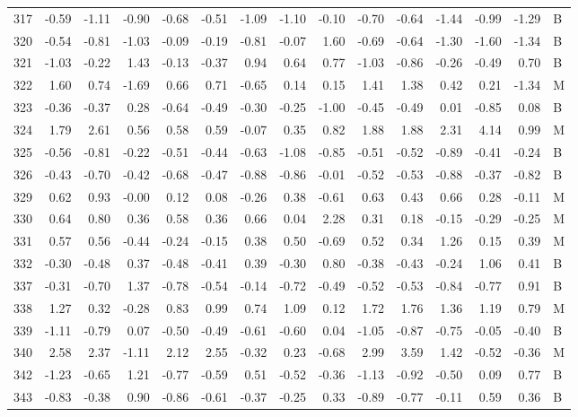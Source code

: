 \begin{table}[ht]
\begin{tabular}{rrrrrrrrrrrrrrl}
  317 & -0.59 & -1.11 & -0.90 & -0.68 & -0.51 & -1.09 & -1.10 & -0.10 & -0.70 & -0.64 & -1.44 & -0.99 & -1.29 & B \\ 
  320 & -0.54 & -0.81 & -1.03 & -0.09 & -0.19 & -0.81 & -0.07 & 1.60 & -0.69 & -0.64 & -1.30 & -1.60 & -1.34 & B \\ 
  321 & -1.03 & -0.22 & 1.43 & -0.13 & -0.37 & 0.94 & 0.64 & 0.77 & -1.03 & -0.86 & -0.26 & -0.49 & 0.70 & B \\ 
  322 & 1.60 & 0.74 & -1.69 & 0.66 & 0.71 & -0.65 & 0.14 & 0.15 & 1.41 & 1.38 & 0.42 & 0.21 & -1.34 & M \\ 
  323 & -0.36 & -0.37 & 0.28 & -0.64 & -0.49 & -0.30 & -0.25 & -1.00 & -0.45 & -0.49 & 0.01 & -0.85 & 0.08 & B \\ 
  324 & 1.79 & 2.61 & 0.56 & 0.58 & 0.59 & -0.07 & 0.35 & 0.82 & 1.88 & 1.88 & 2.31 & 4.14 & 0.99 & M \\ 
  325 & -0.56 & -0.81 & -0.22 & -0.51 & -0.44 & -0.63 & -1.08 & -0.85 & -0.51 & -0.52 & -0.89 & -0.41 & -0.24 & B \\ 
  326 & -0.43 & -0.70 & -0.42 & -0.68 & -0.47 & -0.88 & -0.86 & -0.01 & -0.52 & -0.53 & -0.88 & -0.37 & -0.82 & B \\ 
  329 & 0.62 & 0.93 & -0.00 & 0.12 & 0.08 & -0.26 & 0.38 & -0.61 & 0.63 & 0.43 & 0.66 & 0.28 & -0.11 & M \\ 
  330 & 0.64 & 0.80 & 0.36 & 0.58 & 0.36 & 0.66 & 0.04 & 2.28 & 0.31 & 0.18 & -0.15 & -0.29 & -0.25 & M \\ 
  331 & 0.57 & 0.56 & -0.44 & -0.24 & -0.15 & 0.38 & 0.50 & -0.69 & 0.52 & 0.34 & 1.26 & 0.15 & 0.39 & M \\ 
  332 & -0.30 & -0.48 & 0.37 & -0.48 & -0.41 & 0.39 & -0.30 & 0.80 & -0.38 & -0.43 & -0.24 & 1.06 & 0.41 & B \\ 
  337 & -0.31 & -0.70 & 1.37 & -0.78 & -0.54 & -0.14 & -0.72 & -0.49 & -0.52 & -0.53 & -0.84 & -0.77 & 0.91 & B \\ 
  338 & 1.27 & 0.32 & -0.28 & 0.83 & 0.99 & 0.74 & 1.09 & 0.12 & 1.72 & 1.76 & 1.36 & 1.19 & 0.79 & M \\ 
  339 & -1.11 & -0.79 & 0.07 & -0.50 & -0.49 & -0.61 & -0.60 & 0.04 & -1.05 & -0.87 & -0.75 & -0.05 & -0.40 & B \\ 
  340 & 2.58 & 2.37 & -1.11 & 2.12 & 2.55 & -0.32 & 0.23 & -0.68 & 2.99 & 3.59 & 1.42 & -0.52 & -0.36 & M \\ 
  342 & -1.23 & -0.65 & 1.21 & -0.77 & -0.59 & 0.51 & -0.52 & -0.36 & -1.13 & -0.92 & -0.50 & 0.09 & 0.77 & B \\ 
  343 & -0.83 & -0.38 & 0.90 & -0.86 & -0.61 & -0.37 & -0.25 & 0.33 & -0.89 & -0.77 & -0.11 & 0.59 & 0.36 & B \\ 

\end{tabular}
\end{table}
